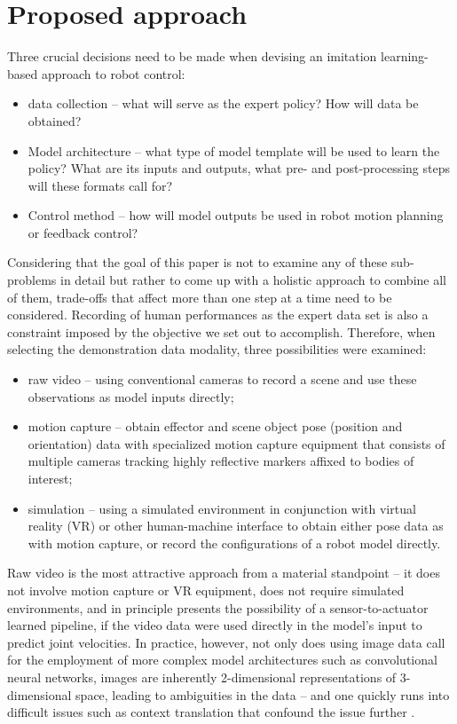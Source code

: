 \documentclass{article}
\begin{document}
\section{Proposed approach}
\label{sec:approach}

Three crucial decisions need to be made when devising an imitation learning-based approach to robot control:
\begin{itemize}
	\item data collection -- what will serve as the expert policy? How will data be obtained?
	\item Model architecture -- what type of model template will be used to learn the policy? What are its inputs and outputs, what pre- and post-processing steps will these formats call for?
	\item Control method -- how will model outputs be used in robot motion planning or feedback control?
\end{itemize}

Considering that the goal of this paper is not to examine any of these sub-problems in detail but rather to come up with a holistic approach to combine all of them, trade-offs that affect more than one step at a time need to be considered. Recording of human performances as the expert data set is also a constraint imposed by the objective we set out to accomplish. Therefore, when selecting the demonstration data modality, three possibilities were examined:
\begin{itemize}
	\item raw video -- using conventional cameras to record a scene and use these observations as model inputs directly;
	\item motion capture -- obtain effector and scene object pose (position and orientation) data with specialized motion capture equipment that consists of multiple cameras tracking highly reflective markers affixed to bodies of interest;
	\item simulation -- using a simulated environment in conjunction with virtual reality (VR) or other human-machine interface to obtain either pose data as with motion capture, or record the configurations of a robot model directly. 
\end{itemize}

Raw video is the most attractive approach from a material standpoint -- it does not involve motion capture or VR equipment, does not require simulated environments, and in principle presents the possibility of a sensor-to-actuator learned pipeline, if the video data were used directly in the model's input to predict joint velocities. In practice, however, not only does using image data call for the employment of more complex model architectures such as convolutional neural networks, images are inherently 2-dimensional representations of 3-dimensional space, leading to ambiguities in the data -- and one quickly runs into difficult issues such as context translation that confound the issue further \citep{liu2018imitation}. 
\end{document}
